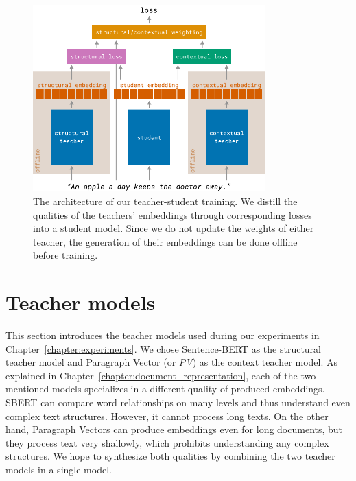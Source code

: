 \begin{figure}
  \centering
  \includegraphics[width=0.8\textwidth]{./img/training_architecture.pdf}

  \caption{The architecture of our teacher-student training. We distill the
  qualities of the teachers' embeddings through corresponding losses into a
  student model. Since we do not update the weights of either teacher,
  the generation of their embeddings can be done offline before training.}

  \label{fig:teacher_student_train_arch}

\end{figure}

\section{Teacher models}\label{section:teacher_models}

This section introduces the teacher models used during our experiments in
Chapter~\ref{chapter:experiments}. We chose Sentence-BERT
\citep{reimers2019sentence} as the structural teacher model and Paragraph
Vector \citep{le2014distributed} (or \emph{PV}) as the context teacher model.
As explained in Chapter~\ref{chapter:document_representation}, each of the two
mentioned models specializes in a different quality of produced embeddings.
SBERT can compare word relationships on many levels and thus understand even
complex text structures. However, it cannot process long texts. On the other
hand, Paragraph Vectors can produce embeddings even for long documents, but they
process text very shallowly, which prohibits understanding any complex
structures. We hope to synthesize both qualities by combining the two
teacher models in a single model.

